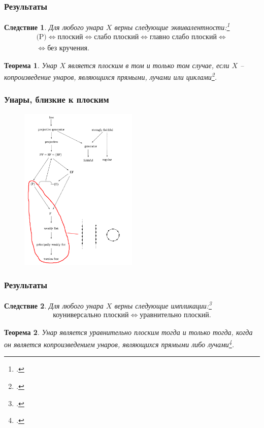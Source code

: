 \documentclass[11pt, notheorems]{beamer}
\newtheorem{theorem}{Теорема}
\newtheorem{corollary}{Следствие}
\begin{document}
\begin{frame}
	\frametitle{Результаты}

	\begin{corollary}
		Для любого унара $X$ верны следующие эквивалентности:\footcite[следствие 3]{pryan:unars_close_to_flat}
		\begin{multline*}
			\text{(P)} \Leftrightarrow \text{плоский} \Leftrightarrow \text{слабо плоский} \Leftrightarrow \text{главно слабо плоский} \Leftrightarrow \\
			\Leftrightarrow \text{без кручения}.
		\end{multline*}
	\end{corollary}

	\begin{theorem}
		Унар $X$ является плоским в том и только том случае, если $X$ -- копроизведение унаров, являющихся прямыми, лучами или циклами\footcite[теорема]{flat_unars}.
	\end{theorem}
\end{frame}

\begin{frame}
	\frametitle{Унары, близкие к плоским}

	\begin{figure}
		\center
		\includegraphics[width=0.5\textwidth]{overview_3.png}
	\end{figure}
\end{frame}

\begin{frame}
	\frametitle{Результаты}

	\begin{corollary}
		Для любого унара $X$ верны следующие импликации:\footcite[следствие 4]{pryan:unars_close_to_flat}
		\begin{gather*}
			\text{коуниверсально плоский} \Leftrightarrow \text{уравнительно плоский}.
		\end{gather*}
	\end{corollary}

	\begin{theorem}
		Унар является уравнительно плоским тогда и только тогда, когда он является копроизведением унаров, являющихся прямыми либо лучами\footcite[теорема 3]{pryan:unars_close_to_flat}.
	\end{theorem}
\end{frame}
\end{document}
